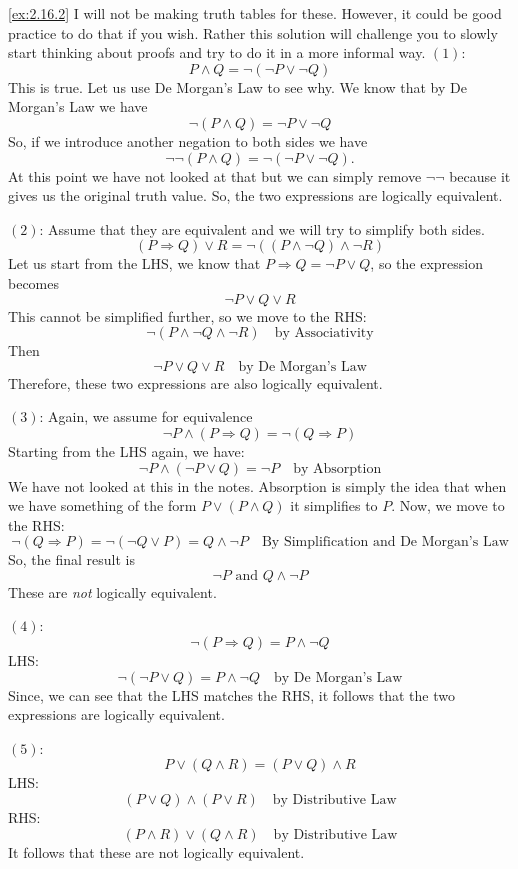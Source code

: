 \begin{solution}\label{sol:2.16.2}\ref{ex:2.16.2}
    I will not be making truth tables for these. However, it could be good practice to do that if you wish. Rather this solution will challenge you to slowly start thinking about proofs and try to do it in a more informal way. 
    $(1)$: 
    $$
    P\land Q = \neg(\neg P\lor \neg Q)
    $$
    This is true. Let us use De Morgan's Law to see why. We know that by De Morgan's Law we have
    $$
    \neg(P\land Q) = \neg P\lor \neg Q
    $$
    So, if we introduce another negation to both sides we have 
    $$
    \neg\neg(P\land Q)= \neg(\neg P\lor \neg Q).
    $$
    At this point we have not looked at that but we can simply remove $\neg\neg$ because it gives us the original truth value. So, the two expressions are logically equivalent. 
    
    $(2)$: Assume that they are equivalent and we will try to simplify both sides.
    $$
    (P\Rightarrow Q)\lor R = \neg((P\land \neg Q)\land \neg R)
    $$
    Let us start from the LHS, we know that $P\Rightarrow Q=\neg P\lor Q$, so the expression becomes 
    $$
    \neg P\lor Q\lor R
    $$
    This cannot be simplified further, so we move to the RHS\@: 
    $$
    \neg(P\land \neg Q\land \neg R)\quad \text{by Associativity}
    $$
    Then 
    $$
    \neg P\lor Q\lor R \quad \text{by De Morgan's Law}
    $$
    Therefore, these two expressions are also logically equivalent. 

    $(3)$: 
    Again, we assume for equivalence
    $$
    \neg P\land (P\Rightarrow Q) = \neg(Q\Rightarrow P)
    $$
    Starting from the LHS again, we have: 
    $$
    \neg P\land (\neg P\lor Q) = \neg P \quad \text{by Absorption}
    $$
    We have not looked at this in the notes. Absorption is simply the idea that when we have something of the form $P\lor (P\land Q)$ it simplifies to $P$. 
    Now, we move to the RHS\@: 
    $$
    \neg(Q\Rightarrow P) = \neg(\neg Q\lor P) = Q \land \neg P \quad \text{By Simplification and De Morgan's Law}
    $$
    So, the final result is 
    $$
    \neg P \text{ and } Q\land \neg P
    $$
    These are \emph{not} logically equivalent. 

    $(4)$: 
    $$
    \neg (P\Rightarrow Q) = P\land \neg Q
    $$
    LHS\@:
    $$
    \neg (\neg P\lor Q) = P\land \neg Q \quad \text{by De Morgan's Law}
    $$
    Since, we can see that the LHS matches the RHS, it follows that the two expressions are logically equivalent. 
    
    $(5)$:
    $$
    P\lor (Q\land R) = (P\lor Q)\land R
    $$
    LHS: 
    $$
    (P\lor Q)\land (P\lor R)\quad \text{by Distributive Law}
    $$
    RHS: 
    $$
    (P\land R)\lor (Q\land R) \quad \text{by Distributive Law}
    $$
    It follows that these are not logically equivalent. 
    

\end{solution}
